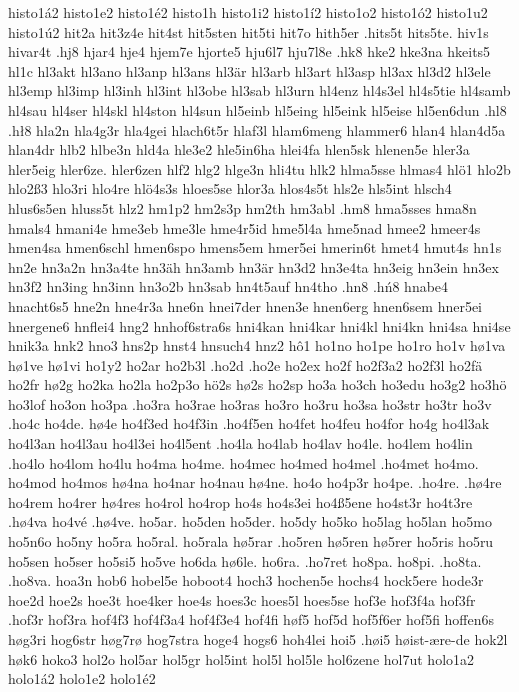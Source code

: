 histo1á2
histo1e2
histo1é2
histo1h
histo1i2
histo1í2
histo1o2
histo1ó2
histo1u2
histo1ú2
hit2a
hit3z4e
hit4st
hit5sten
hit5ti
hit7o
hith5er
.hits5t
hits5te.
hiv1s
hivar4t
.hj8
hjar4
hje4
hjem7e
hjorte5
hju6l7
hju7l8e
.hk8
hke2
hke3na
hkeits5
hl1c
hl3akt
hl3ano
hl3anp
hl3ans
hl3är
hl3arb
hl3art
hl3asp
hl3ax
hl3d2
hl3ele
hl3emp
hl3imp
hl3inh
hl3int
hl3obe
hl3sab
hl3urn
hl4enz
hl4s3el
hl4s5tie
hl4samb
hl4sau
hl4ser
hl4skl
hl4ston
hl4sun
hl5einb
hl5eing
hl5eink
hl5eise
hl5en6dun
.hl8
.hł8
hla2n
hla4g3r
hla4gei
hlach6t5r
hlaf3l
hlam6meng
hlammer6
hlan4
hlan4d5a
hlan4dr
hlb2
hlbe3n
hld4a
hle3e2
hle5in6ha
hlei4fa
hlen5sk
hlenen5e
hler3a
hler5eig
hler6ze.
hler6zen
hlf2
hlg2
hlge3n
hli4tu
hlk2
hlma5sse
hlmas4
hlö1
hlo2b
hlo2ß3
hlo3ri
hlo4re
hlö4s3s
hloes5se
hlor3a
hlos4s5t
hls2e
hls5int
hlsch4
hlus6s5en
hluss5t
hlz2
hm1p2
hm2s3p
hm2th
hm3abl
.hm8
hma5sses
hma8n
hmals4
hmani4e
hme3eb
hme3le
hme4r5id
hme5l4a
hme5nad
hmee2
hmeer4s
hmen4sa
hmen6schl
hmen6spo
hmens5em
hmer5ei
hmerin6t
hmet4
hmut4s
hn1s
hn2e
hn3a2n
hn3a4te
hn3äh
hn3amb
hn3är
hn3d2
hn3e4ta
hn3eig
hn3ein
hn3ex
hn3f2
hn3ing
hn3inn
hn3o2b
hn3sab
hn4t5auf
hn4tho
.hn8
.hń8
hnabe4
hnacht6s5
hne2n
hne4r3a
hne6n
hnei7der
hnen3e
hnen6erg
hnen6sem
hner5ei
hnergene6
hnflei4
hng2
hnhof6stra6s
hni4kan
hni4kar
hni4kl
hni4kn
hni4sa
hni4se
hnik3a
hnk2
hno3
hns2p
hnst4
hnsuch4
hnz2
hô1
ho1no
ho1pe
ho1ro
ho1v
hø1va
hø1ve
hø1vi
ho1y2
ho2ar
ho2b3l
.ho2d
.ho2e
ho2ex
ho2f
ho2f3a2
ho2f3l
ho2fä
ho2fr
hø2g
ho2ka
ho2la
ho2p3o
hö2s
hø2s
ho2sp
ho3a
ho3ch
ho3edu
ho3g2
ho3hö
ho3lof
ho3on
ho3pa
.ho3ra
ho3rae
ho3ras
ho3ro
ho3ru
ho3sa
ho3str
ho3tr
ho3v
.ho4c
ho4de.
hø4e
ho4f3ed
ho4f3in
.ho4f5en
ho4fet
ho4feu
ho4for
ho4g
ho4l3ak
ho4l3an
ho4l3au
ho4l3ei
ho4l5ent
.ho4la
ho4lab
ho4lav
ho4le.
ho4lem
ho4lin
.ho4lo
ho4lom
ho4lu
ho4ma
ho4me.
ho4mec
ho4med
ho4mel
.ho4met
ho4mo.
ho4mod
ho4mos
hø4na
ho4nar
ho4nau
hø4ne.
ho4o
ho4p3r
ho4pe.
.ho4re.
.hø4re
ho4rem
ho4rer
hø4res
ho4rol
ho4rop
ho4s
ho4s3ei
ho4ß5ene
ho4st3r
ho4t3re
.hø4va
ho4vé
.hø4ve.
ho5ar.
ho5den
ho5der.
ho5dy
ho5ko
ho5lag
ho5lan
ho5mo
ho5n6o
ho5ny
ho5ra
ho5ral.
ho5rala
hø5rar
.ho5ren
hø5ren
hø5rer
ho5ris
ho5ru
ho5sen
ho5ser
ho5si5
ho5ve
ho6da
hø6le.
ho6ra.
.ho7ret
ho8pa.
ho8pi.
.ho8ta.
.ho8va.
hoa3n
hob6
hobel5e
hoboot4
hoch3
hochen5e
hochs4
hock5ere
hode3r
hoe2d
hoe2s
hoe3t
hoe4ker
hoe4s
hoes3c
hoes5l
hoes5se
hof3e
hof3f4a
hof3fr
.hof3r
hof3ra
hof4f3
hof4f3a4
hof4f3e4
hof4fi
høf5
hof5d
hof5f6er
hof5fi
hoffen6s
høg3ri
hog6str
høg7rø
hog7stra
hoge4
hogs6
hoh4lei
hoi5
.høi5
høist-ære-de
hok2l
høk6
hoko3
hol2o
hol5ar
hol5gr
hol5int
hol5l
hol5le
hol6zene
hol7ut
holo1a2
holo1á2
holo1e2
holo1é2
